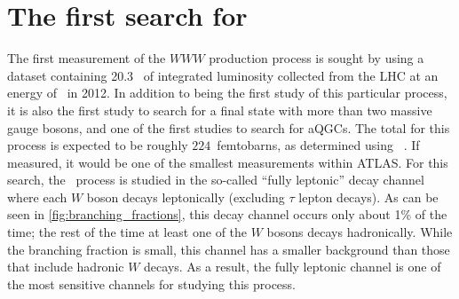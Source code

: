 \chapter{The first search for \wwwlll}
\label{sec:www}





The first measurement of the $WWW$ production process
is sought by using a dataset containing 20.3 \ifb~of integrated luminosity
collected from the LHC at an energy of \energy~in 2012.
In addition to being the first study of this particular process,
it is also the first study to search for a final state with more 
than two massive gauge bosons, and one of the first studies
to search for aQGCs.
The total \xsec for this process is expected
to be roughly $224$~femtobarns, as determined using 
\madgraph~\cite{MadGraph}. If measured, it 
would be one of the smallest \xsec measurements
within ATLAS. %
For this search, the \www~process is studied in the 
so-called ``fully leptonic'' decay channel
where each $W$ boson decays leptonically (excluding $\tau$ lepton decays).
As can be seen in \fig\ref{fig:branching_fractions},
this decay channel occurs only about 1\% of the time;
the rest of the time
at least one of the $W$ bosons decays hadronically.
While the branching fraction is small,
this channel has a smaller background than those 
that include hadronic $W$ decays.
As a result, the fully leptonic channel
is one of the most sensitive channels
for studying this process.


